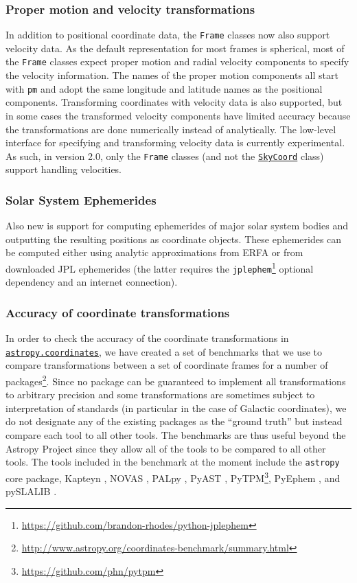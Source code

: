 \documentclass[modern]{aastex62}
\newcommand{\package}[1]{\texttt{#1}\xspace}
\newcommand{\astropy}{Astropy\xspace}
\newcommand{\astropypkg}{\package{astropy}}
\newcommand{\astropysubpkg}[1]{\href{http://docs.astropy.org/en/stable/#1/index.html}{\texttt{astropy.#1}}\xspace}
\newcommand{\astropyskycoord}{\href{http://docs.astropy.org/en/stable/api/astropy.coordinates.SkyCoord.html}{\texttt{SkyCoord}}\xspace}
\begin{document}
\subsubsection{Proper motion and velocity transformations}
    In addition to positional coordinate data, the \texttt{Frame} classes now
    also support velocity data.
    As the default representation for most frames is spherical, most of the
    \texttt{Frame} classes expect proper motion and radial velocity components
    to specify the velocity information.
    The names of the proper motion components all start with \texttt{pm} and
    adopt the same longitude and latitude names as the positional components.
    Transforming coordinates with velocity data is also supported, but in some
    cases the transformed velocity components have limited accuracy because the
    transformations are done numerically instead of analytically.
    The low-level interface for specifying and transforming velocity data  is
    currently experimental.  As such, in version 2.0, only the \texttt{Frame}
    classes (and not the \astropyskycoord class) support handling velocities.

\subsubsection{Solar System Ephemerides}
    Also new is support for computing ephemerides of major solar system bodies
    and outputting the resulting positions as coordinate objects.
    These ephemerides can be computed either using analytic approximations from
    ERFA or from downloaded JPL ephemerides (the latter requires the
    \package{jplephem}\footnote{\url{https://github.com/brandon-rhodes/python-jplephem}}
    optional dependency and an internet connection).

\subsubsection{Accuracy of coordinate transformations}

In order to check the accuracy of the coordinate transformations in
\astropysubpkg{coordinates}, we have created a set of benchmarks that we use
to compare transformations between a set of coordinate frames for a number of
packages\footnote{\url{http://www.astropy.org/coordinates-benchmark/summary.html}}.
Since no package can be guaranteed to implement all transformations to
arbitrary precision and some transformations are sometimes subject to
interpretation of standards (in particular in the case of Galactic coordinates),
we do not designate any of the existing packages as the ``ground truth'' but
instead compare each tool to all other tools. The benchmarks are thus useful
beyond the \astropy Project since they allow all of the tools to be compared to
all other tools. The tools included in the benchmark at the moment include the
\astropypkg core package, Kapteyn \citep{kapteyn}, NOVAS \citep{novas},
PALpy \citep{pal}, PyAST \citep[a wrapper for AST, described in][]{ast},
PyTPM\footnote{\url{https://github.com/phn/pytpm}}, PyEphem \citep{pyephem},
and pySLALIB \citep[a Python wrapper for SLALIB, described in][]{slalib}.
\end{document}
